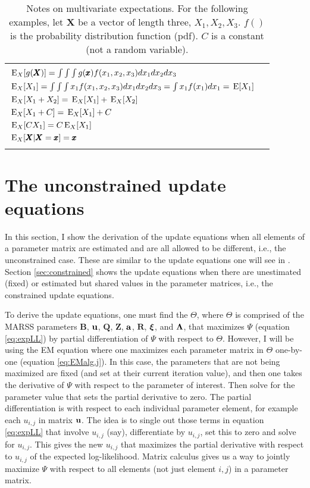 \documentclass[]{article}
\def\xixi{\mbox{\boldmath $\xi$}}
\def\LAM{\mbox{\boldmath $\Lambda$}}
\def\UPS{\mbox{\boldmath $\Upsilon$}}
\def\XI{\mbox{\boldmath $\Xi$}}
\def\BB{\mbox{$\mathbf B$}}	\def\bb{\mbox{$\mathbf b$}} \def\Bb{\mbox{$\mathbf J$}} \def\Ba{\mbox{$\mathbf L$}} \def\Bm{\UPS}
\def\E{\,\textup{\textrm{E}}}
\def\QQ{\mbox{$\mathbf Q$}}	 \def\qq{\mbox{$\mathbf q$}} \def\Qb{\mbox{$\mathbf G$}}  \def\Qm{\mathbb{Q}}
\def\RR{\mbox{$\mathbf R$}}	 \def\rr{\mbox{$\mathbf r$}} \def\Rb{\mbox{$\mathbf H$}}	\def\Rm{\mathbb{R}}
\def\XX{\mbox{$\pmb{X}$}}	\def\xx{\mbox{$\pmb{x}$}}
\def\ZZ{\mbox{$\mathbf Z$}}	\def\zz{\mbox{$\mathbf z$}}	\def\Zb{\mbox{$\mathbf M$}} \def\Za{\mbox{$\mathbf N$}} \def\Zm{\XI}
\begin{document}
\begin{table}
	\caption{Notes on multivariate expectations.  For the following examples, let $\XX$ be a vector of length three, $X_1,X_2,X_3$. $f()$ is the probability distribution function (pdf). $C$ is a constant (not a random variable).}
	\label{tab:MultivariateExpectations}
\begin{center}\begin{tabular}{lr}
\hline\\
$\E_X[g(\XX)]=\int{\int{\int{g(\xx)f(x_1,x_2,x_3) dx_1 dx_2 dx_3}}}$\\
$\E_X[X_1]=\int{\int{\int{x_1 f(x_1,x_2,x_3) dx_1 dx_2 dx_3}}}=\int{x_1 f(x_1) dx_1}=\E[X_1]$ \\
$\E_X[X_1+X_2]=\E_X[X_1]+\E_X[X_2]$\\
$\E_X[X_1+C]=\E_X[X_1]+C$\\
$\E_X[C X_1]=C\E_X[X_1]$\\
$\E_X[\XX|\XX=\xx]=\xx$ \\
\\
\hline
\end{tabular}
\end{center}
\end{table}

\section{The unconstrained update equations}\label{sec:generalupdate}
In this section, I show the derivation of the update equations when all elements of a parameter matrix are estimated and are all allowed to be different, i.e., the unconstrained case. These are similar to the update equations one will see in \citet{ShumwayStoffer2006}.  Section \ref{sec:constrained} shows the update equations when there are unestimated (fixed) or estimated but shared values in the parameter matrices, i.e., the constrained update equations.   

To derive the update equations, one must find the $\Theta$, where $\Theta$ is comprised of the MARSS parameters $\BB$, $\uu$, $\QQ$, $\ZZ$, $\aa$, $\RR$, $\xixi$, and $\LAM$,  that maximizes $\Psi$ (equation \ref{eq:expLL}) by partial differentiation of $\Psi$  with respect to $\Theta$.  However, I will be using the EM equation where one maximizes each parameter matrix in $\Theta$ one-by-one (equation \ref{eq:EMalg.j}).  In this case, the parameters that are not being maximized are fixed (and set at their current iteration value), and then one takes the derivative of $\Psi$ with respect to the parameter of interest.  Then solve for the parameter value that sets the partial derivative to zero.  The partial differentiation is with respect to each individual parameter element, for example each $u_{i,j}$ in matrix $\uu$. The idea is to single out those terms in equation \ref{eq:expLL} that involve $u_{i,j}$ (say), differentiate by $u_{i,j}$, set this to zero and solve for $u_{i,j}$.  This gives the new $u_{i,j}$ that maximizes the partial derivative with respect to $u_{i,j}$ of the expected log-likelihood.  Matrix calculus gives us a way to jointly maximize $\Psi$ with respect to all elements (not just element $i,j$) in a parameter matrix.
\end{document}
